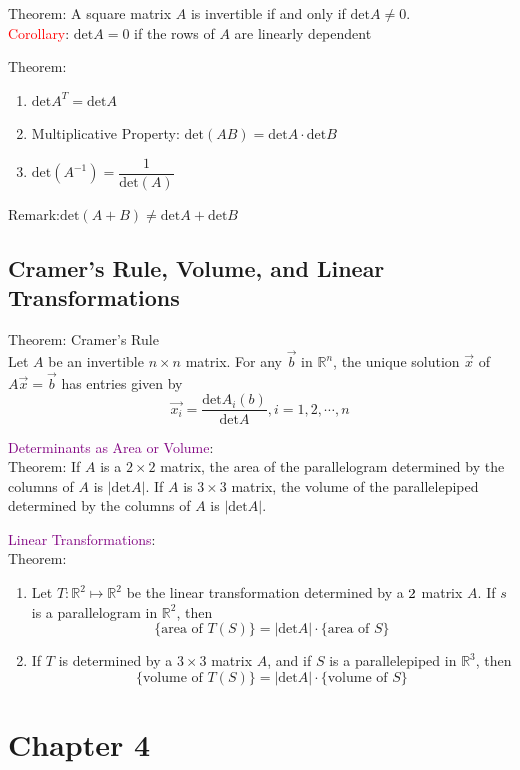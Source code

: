 \documentclass[12pt]{article}
\begin{document}
Theorem: A square matrix $A$ is invertible if and only if $\text{det}A \neq 0$.
\\
\textcolor{red}{Corollary}: $\text{det}A=0$ if the rows of $A$ are linearly dependent

Theorem: 
\begin{enumerate}
    \item $\text{det}A^T = \text{det}A$
    \item Multiplicative Property: $\text{det}(AB) = \text{det}A\cdot\text{det}B$
    \item $\text{det}(A^{-1}) = \dfrac{1}{\text{det}(A)}$
\end{enumerate}
Remark:$\text{det}(A+B) \neq \text{det}A+\text{det}B$


\subsection{Cramer's Rule, Volume, and Linear Transformations}
Theorem: Cramer's Rule
\\
Let $A$ be an invertible $n\times n$ matrix. For any $\vec{b}$ in $\mathbb{R}^n$, the unique solution $\vec{x}$ of $A\vec{x} = \vec{b}$ has entries given by $$\vec{x_i} = \dfrac{\text{det}A_i(b)}{\text{det}A}, i = 1,2,\cdots,n$$

\textcolor{purple}{Determinants as Area or Volume}:
\\
Theorem: If $A$ is a $2\times2$ matrix, the area of the parallelogram determined by the columns of $A$ is $|\text{det}A|$. If $A$ is $3\times3$ matrix, the volume of the parallelepiped determined by the columns of $A$ is $|\text{det}A|$.


\textcolor{purple}{Linear Transformations}:
\\
Theorem: 
\begin{enumerate}
    \item Let $T: \mathbb{R}^2  \longmapsto  \mathbb{R}^2$ be the linear transformation determined by a $2\time2$ matrix $A$. If $s$ is a parallelogram in $\mathbb{R}^2$, then $$\{\text{area of }T(S)\} = |\text{det}A|\cdot \{\text{area of }S\}$$
    \item If $T$ is determined by a $3\times3$ matrix $A$, and if $S$ is a parallelepiped in $\mathbb{R}^3$, then $$\{\text{volume of }T(S)\} = |\text{det}A|\cdot \{\text{volume of }S\}$$
\end{enumerate}



\section{Chapter 4}
\end{document}
